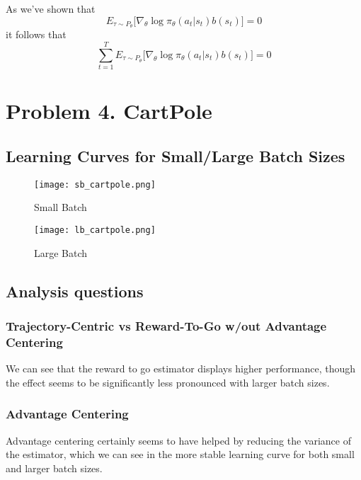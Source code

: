 \documentclass[a4paper]{article}
\begin{document}
As we've shown that $$E_{\tau \sim P_\theta} \bigg[  \nabla_\theta \log \pi_\theta (a_t|s_t) b(s_t) \bigg] = 0$$ it follows that $$\sum_{t = 1}^T E_{\tau \sim P_\theta} \bigg[  \nabla_\theta \log \pi_\theta (a_t|s_t) b(s_t) \bigg] =0 $$






\section*{Problem 4. CartPole}
\subsection*{Learning Curves for Small/Large Batch Sizes}
\begin{figure}[H]
\centering
\texttt{[image: sb\_cartpole.png]}
\caption{Small Batch}
\end{figure}

\begin{figure}[H]
\centering
\texttt{[image: lb\_cartpole.png]}
\caption{Large Batch}
\end{figure}

\subsection*{Analysis questions}
\subsubsection*{Trajectory-Centric vs Reward-To-Go w/out Advantage Centering}
We can see that the reward to go estimator displays higher performance, though the effect seems to be significantly less pronounced with larger batch sizes.
\subsubsection*{Advantage Centering}
Advantage centering certainly seems to have helped by reducing the variance of the estimator, which we can see in the more stable learning curve for both small and larger batch sizes. 
\end{document}

